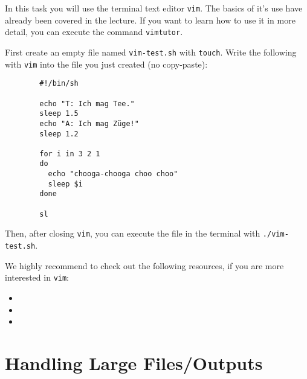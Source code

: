 \documentclass[english]{sheet}
\begin{document}
\begin{exercise}[subtitle=\texttt{vim}]
    In this task you will use the terminal text editor \texttt{vim}. The basics of it's use have already been covered in the lecture. If you want to learn how to use it in more detail, you can execute the command \texttt{vimtutor}.

    First create an empty file named \texttt{vim-test.sh} with \texttt{touch}. Write the following with \texttt{vim} into the file you just created (no copy-paste):

    \begin{verbatim}
        #!/bin/sh

        echo "T: Ich mag Tee."
        sleep 1.5
        echo "A: Ich mag Züge!"
        sleep 1.2

        for i in 3 2 1
        do
          echo "chooga-chooga choo choo"
          sleep $i
        done

        sl
    \end{verbatim}

    Then, after closing \texttt{vim}, you can execute the file in the terminal with \texttt{./vim-test.sh}.

    We highly recommend to check out the following resources, if you are more interested in \texttt{vim}:

    \begin{itemize}
        \item {}
        \item {}
        \item {}
    \end{itemize}

\end{exercise}

\section{Handling Large Files/Outputs}
\end{document}
